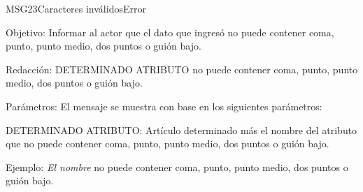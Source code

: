 \begin{mensaje}{MSG23}{Caracteres inválidos}{Error}
    \item[Objetivo:] Informar al actor que el dato que ingresó no puede contener coma, punto, punto medio, dos puntos o guión bajo.
    \item[Redacción:] DETERMINADO ATRIBUTO no puede contener coma, punto, punto medio, dos puntos o guión bajo.
    \item[Parámetros:] El mensaje se muestra con base en los siguientes parámetros:
    \begin{Citemize}
	\item DETERMINADO ATRIBUTO: Artículo determinado más el nombre del atributo que no puede contener coma, punto, punto medio, dos puntos o guión bajo.
    \end{Citemize}
    \item[Ejemplo:] { \em El nombre} no puede contener coma, punto, punto medio, dos puntos o guión bajo.
\end{mensaje}